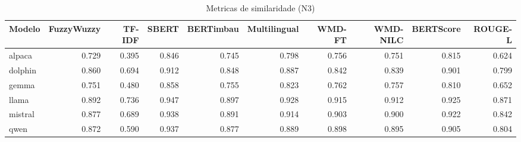 \begin{table}[ht]
  \centering
  \caption{Metricas de similaridade (N3)}
  \label{tab:results_n3_similarity}
  \begin{tabular}{lrrrrrrrrr}
    \toprule
    Modelo & FuzzyWuzzy & TF-IDF & SBERT & BERTimbau & Multilingual & WMD-FT & WMD-NILC & BERTScore & ROUGE-L \\
    \midrule
    alpaca & 0.729 & 0.395 & 0.846 & 0.745 & 0.798 & 0.756 & 0.751 & 0.815 & 0.624 \\
    dolphin & 0.860 & 0.694 & 0.912 & 0.848 & 0.887 & 0.842 & 0.839 & 0.901 & 0.799 \\
    gemma & 0.751 & 0.480 & 0.858 & 0.755 & 0.823 & 0.762 & 0.757 & 0.810 & 0.652 \\
    llama & 0.892 & 0.736 & 0.947 & 0.897 & 0.928 & 0.915 & 0.912 & 0.925 & 0.871 \\
    mistral & 0.877 & 0.689 & 0.938 & 0.891 & 0.914 & 0.903 & 0.900 & 0.922 & 0.842 \\
    qwen & 0.872 & 0.590 & 0.937 & 0.877 & 0.889 & 0.898 & 0.895 & 0.905 & 0.804 \\
    \bottomrule
  \end{tabular}
\end{table}

